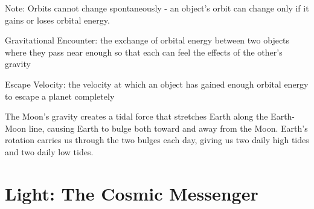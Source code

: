 \documentclass[12pt]{article}
\begin{document}
Note: Orbits cannot change spontaneously - an object's orbit can change only if it gains or loses orbital energy. 
\begin{definition} Gravitational Encounter: the exchange of orbital energy between two objects where they pass near enough so that each can feel the effects of the other's gravity \end{definition} 
\begin{definition} Escape Velocity: the velocity at which an object has gained enough orbital energy to escape a planet completely \end{definition} 
The Moon's gravity creates a tidal force that stretches Earth along the Earth-Moon line, causing Earth to bulge both toward and away from the Moon. Earth's rotation carries us through the two bulges each day, giving us two daily high tides and two daily low tides.

\section{Light: The Cosmic Messenger} 
\end{document}
